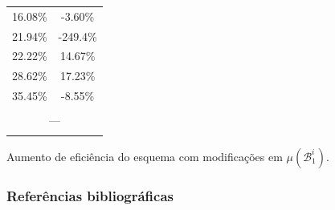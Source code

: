 \documentclass[12pt]{beamer}
\begin{document}
\begin{frame}
\begin{table}
\begin{tabular}{cc}
      16.08\%       & -3.60\%       \\
      21.94\%       & -249.4\%     \\
      \midrule
      22.22\%       & 14.67\%       \\
      28.62\%       & 17.23\%       \\
      35.45\%       & -8.55\%       \\
      \midrule
      \multicolumn{2}{c}{}          \\
      \multicolumn{2}{c}{---}       \\
      \multicolumn{2}{c}{}          \\
      \bottomrule
    \end{tabular}
  \end{table}
  \begin{center}
    Aumento de eficiência do esquema com modificações
      em $\mu(\mathcal{B}_{1}^{i})$.
  \end{center}
\end{frame}

\begin{frame}
  \frametitle{Referências bibliográficas}
  
  
\end{frame}
\end{document}
